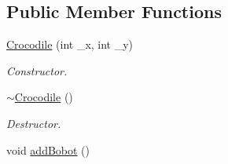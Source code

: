 \subsection*{Public Member Functions}
\begin{DoxyCompactItemize}
\item 
\hyperlink{classCrocodile_abf158d817964be28b0a3fb555e195470}{Crocodile} (int \-\_\-x, int \-\_\-y)
\begin{DoxyCompactList}\small\item\em Constructor. \end{DoxyCompactList}\item 
\hypertarget{classCrocodile_aadc4a352f8baba14cdc08c20c46d92c0}{\hyperlink{classCrocodile_aadc4a352f8baba14cdc08c20c46d92c0}{$\sim$\-Crocodile} ()}\label{classCrocodile_aadc4a352f8baba14cdc08c20c46d92c0}

\begin{DoxyCompactList}\small\item\em Destructor. \end{DoxyCompactList}\item 
\hypertarget{classCrocodile_a993a3e8b0b5a3e6e48e9a4ac8e30a6ad}{void \hyperlink{classCrocodile_a993a3e8b0b5a3e6e48e9a4ac8e30a6ad}{add\-Bobot} ()}\label{classCrocodile_a993a3e8b0b5a3e6e48e9a4ac8e30a6ad}


\end{DoxyCompactItemize}
